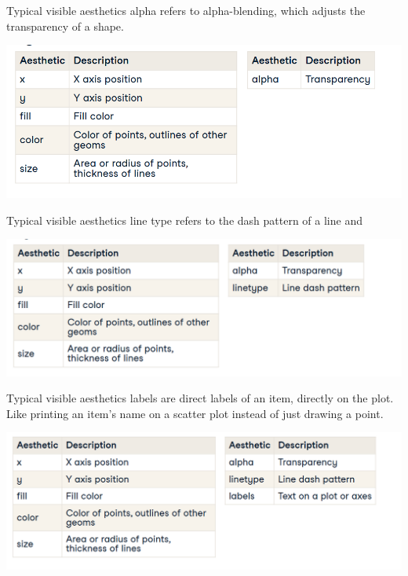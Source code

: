 \documentclass[
  ignorenonframetext,
]{beamer}
\begin{document}
\begin{frame}{Typical visible aesthetics}
\label{typical-visible-aesthetics-4}
alpha refers to alpha-blending, which adjusts the transparency of a
shape.

\includegraphics{../images/im143.png}
\end{frame}

\begin{frame}{Typical visible aesthetics}
\label{typical-visible-aesthetics-5}
line type refers to the dash pattern of a line and

\includegraphics{../images/im144.png}
\end{frame}

\begin{frame}{Typical visible aesthetics}
\label{typical-visible-aesthetics-6}
labels are direct labels of an item, directly on the plot. Like printing
an item's name on a scatter plot instead of just drawing a point.

\includegraphics{../images/im145.png}
\end{frame}
\end{document}
